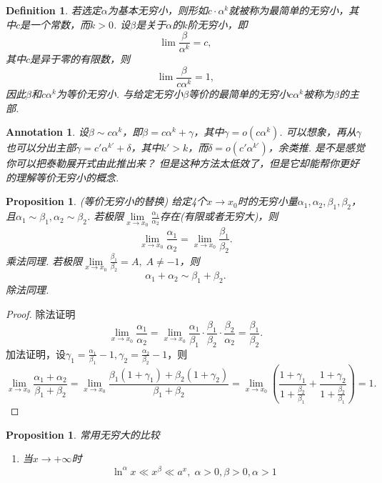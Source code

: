 \documentclass{article}
\newtheorem{proposition}[theorem]{Proposition}
\newtheorem{definition}[theorem]{Definition}
\newtheorem{annotation}[theorem]{Annotation}
\begin{document}
\begin{definition}
\rm 若选定$\alpha$为基本无穷小，则形如$c\cdot \alpha^k$就被称为{\color{red}最简单的无穷小}，其中$c$是一个常数，而$k > 0$. 设$\beta$是关于$\alpha$的$k$阶无穷小，即
$$
\lim \frac{\beta}{\alpha^k} = c,
$$
其中$c$是异于零的有限数，则
$$
\lim \frac{\beta}{c\alpha^k} = 1,
$$
因此$\beta$和$c\alpha^k$为等价无穷小. 与给定无穷小$\beta$等价的最简单的无穷小$c\alpha^k$被称为$\beta$的{\color{red}主部}.
\end{definition}

\begin{annotation}
\rm 设$\beta \sim c\alpha^k$，即$\beta = c\alpha^k + \gamma$，其中$\gamma = o(c\alpha^k)$. 可以想象，再从$\gamma$也可以分出主部$\gamma = c'\alpha^{k'} + \delta$，其中$k' > k$，而$\delta = o(c'\alpha^{k'})$，余类推. {\color{blue}是不是感觉你可以把泰勒展开式由此推出来？ 但是这种方法太低效了，但是它却能帮你更好的理解等价无穷小的概念}.
\end{annotation}

\begin{proposition}
\rm {\color{red} (等价无穷小的替换) }给定4个$x \rightarrow x_0$时的无穷小量$\alpha_1,\alpha_2,\beta_1,\beta_2$，且$\alpha_1 \sim \beta_1, \alpha_2 \sim \beta_2$. 若极限$\lim\limits_{x \rightarrow x_0} \frac{\alpha_1}{\alpha_2}$存在(有限或者无穷大)，则
$$
\lim\limits_{x \rightarrow x_0} \frac{\alpha_1}{\alpha_2} = \lim\limits_{x \rightarrow x_0} \frac{\beta_1}{\beta_2}.
$$
乘法同理. 若极限$\lim\limits_{x \rightarrow x_0} \frac{\beta_1}{\beta_2} = A, \; A \neq -1$，则
$$
\alpha_1 + \alpha_2 \sim \beta_1 + \beta_2.
$$ 
除法同理.
\end{proposition}

\begin{proof}
除法证明
$$
\lim\limits_{x \rightarrow x_0} \frac{\alpha_1}{\alpha_2}= \lim\limits_{x \rightarrow x_0} \frac{\alpha_1}{\beta_1} \cdot \frac{\beta_1}{\beta_2} \cdot \frac{\beta_2}{\alpha_2} = \frac{\beta_1}{\beta_2}. 
$$
加法证明，设$\gamma_1 = \frac{\alpha_1}{\beta_1} - 1,\gamma_2 = \frac{\alpha_2}{\beta_2} - 1$，则
$$
\lim\limits_{x \rightarrow x_0} \frac{\alpha_1+\alpha_2}{\beta_1 + \beta_2} = \lim\limits_{x \rightarrow x_0} \frac{\beta_1(1+\gamma_1) + \beta_2(1+\gamma_2)}{\beta_1 + \beta_2} = \lim\limits_{x \rightarrow x_0} \left( \frac{1+\gamma_1}{1+\frac{\beta_2}{\beta_1}} + \frac{1+\gamma_2}{1+\frac{\beta_2}{\beta_1}} \right) = 1. 
$$
\end{proof}

\begin{proposition}
\rm  {\color{red} 常用无穷大的比较}
\begin{enumerate}
	\item 当$x \rightarrow +\infty$时
	$$
		\ln^\alpha x \ll x^\beta \ll a^x, \;\alpha > 0 ,\beta > 0,\alpha > 1 
	$$
\end{enumerate}
\end{proposition}
\end{document}
